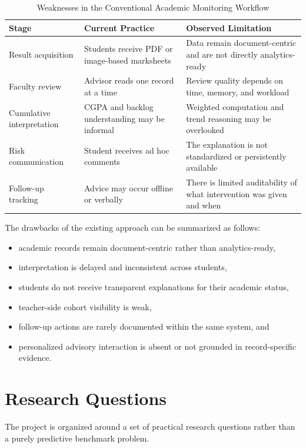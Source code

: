 \begin{table}[H]
\centering
\caption{Weaknesses in the Conventional Academic Monitoring Workflow}
\begin{tabularx}{\textwidth}{>{\raggedright\arraybackslash}p{} >{\raggedright\arraybackslash}p{} >{\raggedright\arraybackslash}X}
\toprule
\textbf{Stage} & \textbf{Current Practice} & \textbf{Observed Limitation} \\
\midrule
Result acquisition & Students receive PDF or image-based marksheets & Data remain document-centric and are not directly analytics-ready \\
Faculty review & Advisor reads one record at a time & Review quality depends on time, memory, and workload \\
Cumulative interpretation & CGPA and backlog understanding may be informal & Weighted computation and trend reasoning may be overlooked \\
Risk communication & Student receives ad hoc comments & The explanation is not standardized or persistently available \\
Follow-up tracking & Advice may occur offline or verbally & There is limited auditability of what intervention was given and when \\
\bottomrule
\end{tabularx}
\end{table}

The drawbacks of the existing approach can be summarized as follows:
\begin{itemize}[leftmargin=*]
\item academic records remain document-centric rather than analytics-ready,
\item interpretation is delayed and inconsistent across students,
\item students do not receive transparent explanations for their academic status,
\item teacher-side cohort visibility is weak,
\item follow-up actions are rarely documented within the same system, and
\item personalized advisory interaction is absent or not grounded in record-specific evidence.
\end{itemize}

\section{Research Questions}
The project is organized around a set of practical research questions rather than a purely predictive benchmark problem.

